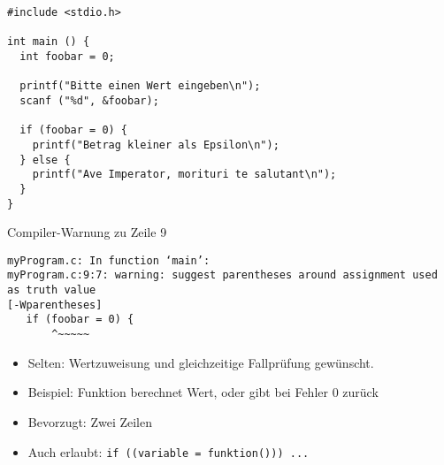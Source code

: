 
\begin{frame}[fragile]
%
\begin{codebox}
\begin{verbatim}
#include <stdio.h>

int main () {
  int foobar = 0;
  
  printf("Bitte einen Wert eingeben\n");
  scanf ("%d", &foobar);
  
  if (foobar = 0) {
    printf("Betrag kleiner als Epsilon\n");
  } else {
    printf("Ave Imperator, morituri te salutant\n");
  }
}
\end{verbatim}
\end{codebox}
%
\begin{warnbox}
\small Compiler-Warnung zu Zeile 9
\end{warnbox}
%
\end{frame}


\begin{frame}[fragile]
%
\begin{cmdbox}
\begin{verbatim}
myProgram.c: In function ‘main’:
myProgram.c:9:7: warning: suggest parentheses around assignment used as truth value 
[-Wparentheses]
   if (foobar = 0) {
       ^~~~~~
\end{verbatim}
\end{cmdbox}
%
\begin{hintbox}
\begin{itemize}
\item Selten: Wertzuweisung und gleichzeitige Fallprüfung gewünscht.
\item Beispiel: Funktion berechnet Wert, oder gibt bei Fehler 0 zurück
\item Bevorzugt: Zwei Zeilen
\item Auch erlaubt: \newline
	\texttt{if ((variable = funktion())) ... }
\end{itemize}
\end{hintbox}
%
\end{frame}


